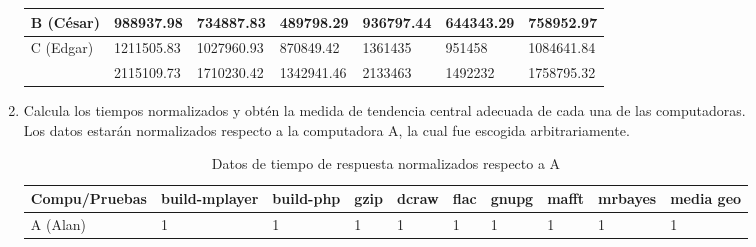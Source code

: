 \documentclass{article}
\begin{document}
\begin{enumerate}
{\begin{itemize}
{\begin{table}[H]
\begin{tabular}{|l|l|l|l|l|l|l|}
                            \cellcolor[HTML]{FFFE65}{\color[HTML]{000000}}
                            B (César) & 988937.98 & 734887.83 & 489798.29 
                            & 936797.44 & 644343.29 & 758952.97\\ \hline
            
                            \cellcolor[HTML]{34FF34}{\color[HTML]{000000}} 
                            C (Edgar) & 1211505.83 & 1027960.93 & 870849.42 
                            & 1361435 & 951458 & 1084641.84\\ \hline
            
                            \cellcolor[HTML]{9698ED}{\color[HTML]{000000} 
                            D(Sandra)} & 2115109.73 & 1710230.42 & 1342941.46 
                            & 2133463 & 1492232 & 1758795.32 \\ \hline
                        \end{tabular}
                    \end{table} 
                }
            \end{itemize}
            
        }
        
        \item {
            Calcula los tiempos normalizados y obtén la medida de tendencia 
            central adecuada de cada una de las computadoras. \\
            
            Los datos estarán normalizados respecto a la computadora A, la cual fue escogida arbitrariamente.

            \begin{table}[H]
                \caption*{Datos de tiempo de respuesta normalizados respecto a A}
                \begin{tabular}{|l|l|l|l|l|l|l|l|l|l|}
                \toprule
                Compu/Pruebas 
                & \cellcolor[HTML]{DAE8FC}build-mplayer 
                & \cellcolor[HTML]{DAE8FC}build-php 
                & \cellcolor[HTML]{DAE8FC}gzip 
                & \cellcolor[HTML]{DAE8FC}dcraw  
                & \cellcolor[HTML]{DAE8FC}flac 
                & \cellcolor[HTML]{DAE8FC}gnupg 
                & \cellcolor[HTML]{DAE8FC}mafft 
                & \cellcolor[HTML]{DAE8FC}mrbayes 
                & \cellcolor[HTML]{DAE8FC}media geo \\ \hline
    
                \cellcolor[HTML]{F8A102}{\color[HTML]{000000}} 
                A (Alan) & 1 & 1 & 1 & 1 & 1 & 1 & 1 & 1 & 1 \\ \hline
    

\end{tabular}
\end{table}}
\end{enumerate}
\end{document}
